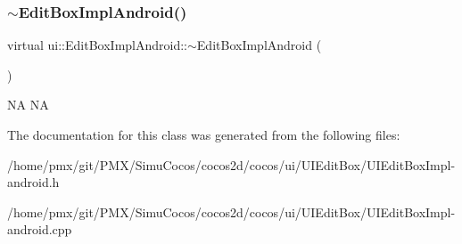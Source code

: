 \subsubsection{\texorpdfstring{$\sim$\+Edit\+Box\+Impl\+Android()}{~EditBoxImplAndroid()}\hspace{0.1cm}{\footnotesize\ttfamily [2/2]}}
{\footnotesize\ttfamily virtual ui\+::\+Edit\+Box\+Impl\+Android\+::$\sim$\+Edit\+Box\+Impl\+Android (\begin{DoxyParamCaption}{ }\end{DoxyParamCaption})\hspace{0.3cm}{\ttfamily [virtual]}}

NA  NA 

The documentation for this class was generated from the following files\+:\begin{DoxyCompactItemize}
\item 
/home/pmx/git/\+P\+M\+X/\+Simu\+Cocos/cocos2d/cocos/ui/\+U\+I\+Edit\+Box/U\+I\+Edit\+Box\+Impl-\/android.\+h\item 
/home/pmx/git/\+P\+M\+X/\+Simu\+Cocos/cocos2d/cocos/ui/\+U\+I\+Edit\+Box/U\+I\+Edit\+Box\+Impl-\/android.\+cpp\end{DoxyCompactItemize}
